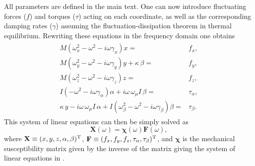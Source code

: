 \documentclass[twocolumn,superscriptaddress,floatfix,preprintnumbers,prl]{revtex4}
\begin{document}
All parameters are defined in the main text. One can now introduce fluctuating forces ($f$) and torques ($\tau$) acting on each coordinate, as well as the corresponding damping rates ($\gamma$) assuming the fluctuation-dissipation theorem in thermal equilibrium. Rewriting these equations in the frequency domain one obtains
\begin{align} \label{eq:Help}
\begin{split}
    M\left(\omega_x^2-\omega^2 -i\omega \gamma_x \right) x= & f_x,\\
    M\left(\omega_y^2-\omega^2 -i\omega \gamma_y \right) y+\kappa\, \beta= & f_y,\\
    M\left(\omega_z^2-\omega^2 -i\omega \gamma_z \right) z= & f_z,\\
    I\left(-\omega^2 -i\omega \gamma_{\alpha}\right) \alpha + i\omega\, \omega_{\mu} I\, \beta= & \tau_{\alpha},\\
    \kappa\, y-i\omega\, \omega_{\mu} I\, \alpha +I\left(\omega^2_{\beta}-\omega^2 -i\omega \gamma_{\beta}\right) \beta= & \tau_{\beta}.
\end{split}
\end{align}
This system of linear equations can then be simply solved as 
\begin{equation} \label{eq.xi}
\mathbf{X}(\omega)=\boldsymbol{\chi}(\omega)\mathbf{F}(\omega),
\end{equation}
where $\mathbf{X} \equiv (x,y,z,\alpha,\beta)^{\rm T}$, $\mathbf{F} \equiv (f_x,f_y,f_z,\tau_{\alpha},\tau_{\beta})^{\rm T}$, and $\boldsymbol{\chi}$ is the mechanical susceptibility matrix given by the inverse of the matrix giving the system of linear equations in .
\end{document}
